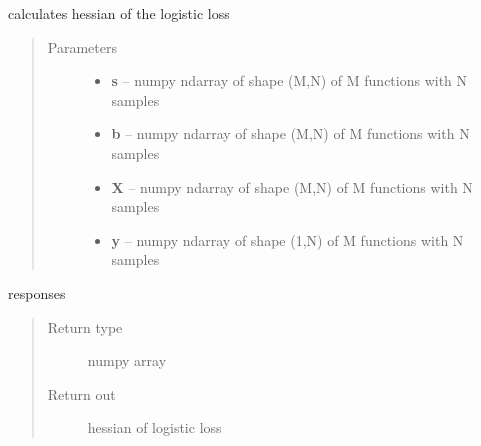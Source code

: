 \documentclass[letterpaper,10pt,english]{sphinxmanual}
\begin{document}
\begin{fulllineitems}
\label{regression:regression.logit_hessian}
calculates hessian of the logistic loss
\begin{quote}\begin{description}
\item[{Parameters}] \leavevmode\begin{itemize}
\item {} 
\textbf{s} -- numpy ndarray of shape (M,N) of M functions with N samples

\item {} 
\textbf{b} -- numpy ndarray of shape (M,N) of M functions with N samples

\item {} 
\textbf{X} -- numpy ndarray of shape (M,N) of M functions with N samples

\item {} 
\textbf{y} -- numpy ndarray of shape (1,N) of M functions with N samples

\end{itemize}

\end{description}\end{quote}

responses
\begin{quote}\begin{description}
\item[{Return type}] \leavevmode
numpy array

\item[{Return out}] \leavevmode
hessian of logistic loss

\end{description}\end{quote}

\end{fulllineitems}

\end{document}
